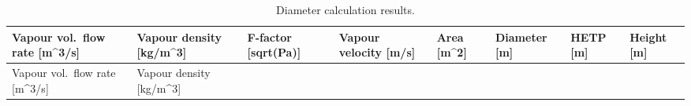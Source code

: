 \begin{longtable}[]{@{}
  >{\raggedright\arraybackslash}p{}
  >{\raggedright\arraybackslash}p{}
  >{\raggedright\arraybackslash}p{}
  >{\raggedright\arraybackslash}p{}
  >{\raggedright\arraybackslash}p{}
  >{\raggedright\arraybackslash}p{}
  >{\raggedright\arraybackslash}p{}
  >{\raggedright\arraybackslash}p{}@{}}
\caption{Diameter calculation results.
\label{tab:Diameter calculation results}}\tabularnewline
\toprule\noalign{}
\begin{minipage}[b]{\linewidth}\raggedright
Vapour vol.~flow rate {[}m\^{}3/s{]}
\end{minipage} & \begin{minipage}[b]{\linewidth}\raggedright
Vapour density {[}kg/m\^{}3{]}
\end{minipage} & \begin{minipage}[b]{\linewidth}\raggedright
F-factor {[}sqrt(Pa){]}
\end{minipage} & \begin{minipage}[b]{\linewidth}\raggedright
Vapour velocity {[}m/s{]}
\end{minipage} & \begin{minipage}[b]{\linewidth}\raggedright
Area {[}m\^{}2{]}
\end{minipage} & \begin{minipage}[b]{\linewidth}\raggedright
Diameter {[}m{]}
\end{minipage} & \begin{minipage}[b]{\linewidth}\raggedright
HETP {[}m{]}
\end{minipage} & \begin{minipage}[b]{\linewidth}\raggedright
Height {[}m{]}
\end{minipage} \\
\midrule\noalign{}
\endfirsthead
\toprule\noalign{}
\begin{minipage}[b]{\linewidth}\raggedright
Vapour vol.~flow rate {[}m\^{}3/s{]}
\end{minipage} & \begin{minipage}[b]{\linewidth}\raggedright
Vapour density {[}kg/m\^{}3{]}
\end{minipage} & \begin{minipage}[b]{\linewidth}\raggedright

\end{minipage}
\end{longtable}
